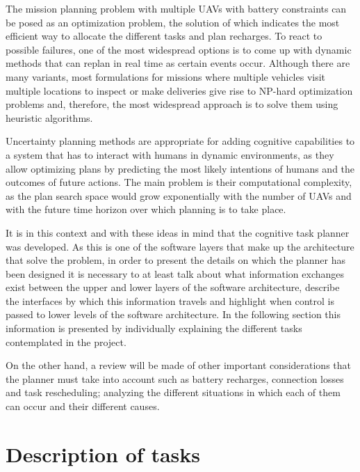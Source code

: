 The mission planning problem with multiple \glspl{UAV} with battery constraints can be posed as an optimization problem, the solution of which indicates the most efficient way to allocate the different tasks and plan recharges. To react to possible failures, one of the most widespread options is to come up with dynamic methods that can replan in real time as certain events occur. Although there are many variants, most formulations for missions where multiple vehicles visit multiple locations to inspect or make deliveries give rise to NP-hard optimization problems and, therefore, the most widespread approach is to solve them using heuristic algorithms.

Uncertainty planning methods are appropriate for adding cognitive capabilities to a system that has to interact with humans in dynamic environments, as they allow optimizing plans by predicting the most likely intentions of humans and the outcomes of future actions. The main problem is their computational complexity, as the plan search space would grow exponentially with the number of \glspl{UAV} and with the future time horizon over which planning is to take place.

It is in this context and with these ideas in mind that the cognitive task planner was developed. As this is one of the software layers that make up the architecture that solve the problem, in order to present the details on which the planner has been designed it is necessary to at least talk about what information exchanges exist between the upper and lower layers of the software architecture, describe the interfaces by which this information travels and highlight when control is passed to lower levels of the software architecture. In the following section this information is presented by individually explaining the different tasks contemplated in the project. 

On the other hand, a review will be made of other important considerations that the planner must take into account such as battery recharges, connection losses and task rescheduling; analyzing the different situations in which each of them can occur and their different causes. 

\section{Description of tasks}
\label{sec:DescriptionOfTasks}


